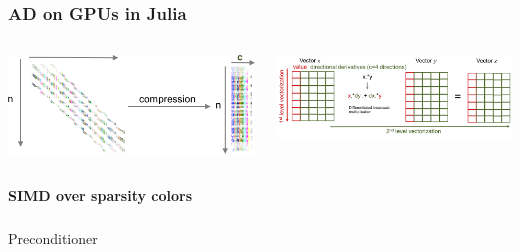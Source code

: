 \begin{frame}
  \frametitle{AD on GPUs in Julia}
  \begin{columns}[T]
    \begin{column}{0.35\textwidth}
      \begin{center}
        \vspace{0.2cm}
        \includegraphics[width=\linewidth]{figures/compression}
      \end{center}
    \end{column}
    \begin{column}{0.6\textwidth}
      \begin{center}
        \includegraphics[width=\linewidth]{figures/simd}
      \end{center}
    \end{column}
  \end{columns}
  \begin{center}
  \end{center}
  {\bf SIMD over sparsity colors}
\end{frame}

\begin{frame}
  \frametitle{}
  \centering
  {\Huge Preconditioner}
\end{frame}

